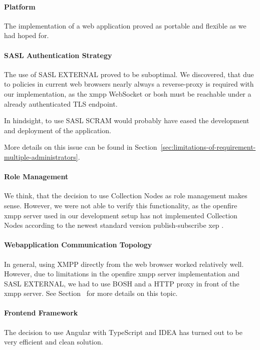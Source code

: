 \paragraph{Platform}
The implementation of a web application proved as portable and flexible as we had hoped for.

\paragraph{SASL Authentication Strategy}
The use of SASL EXTERNAL proved to be suboptimal.
We discovered, that due to policies in current web browsers nearly always a reverse-proxy is required with our implementation, as the \gls{xmpp} WebSocket or \gls{bosh} must be reachable under a already authenticated TLS endpoint.

In hindsight, to use SASL SCRAM would probably have eased the development and deployment of the application.

More details on this issue can be found in Section~\ref{sec:limitations-of-requirement-multiple-administrators}.

\paragraph{Role Management}
We think, that the decision to use Collection Nodes as role management makes sense.
However, we were not able to verify this functionality, as the openfire \gls{xmpp} server used in our development setup has not implemented Collection Nodes according to the newest standard version \gls{publish-subscribe} \gls{xep} \cite{xep-0248}.

\paragraph{Webapplication Communication Topology}
In general, using XMPP directly from the web browser worked relatively well.
However, due to limitations in the openfire \gls{xmpp} server implementation and SASL EXTERNAL, we had to use BOSH and a HTTP proxy in front of the \gls{xmpp} server. See Section~ for more details on this topic.

\paragraph{Frontend Framework}
The decision to use Angular with TypeScript and IDEA has turned out to be very efficient and clean solution.

